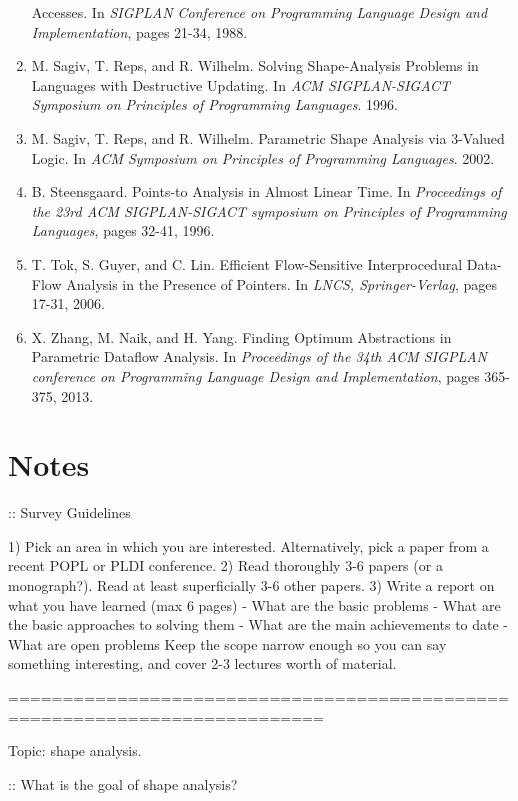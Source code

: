 \documentclass{article}
\begin{document}
\begin{enumerate}[1.]
        Accesses. In \textit{SIGPLAN Conference on Programming Language
        Design and Implementation}, pages 21-34, 1988.
    \item M. Sagiv, T. Reps, and R. Wilhelm. Solving Shape-Analysis Problems
        in Languages with Destructive Updating. In \textit{ACM
        SIGPLAN-SIGACT Symposium on Principles of Programming Languages}.
        1996.
    \item M. Sagiv, T. Reps, and R. Wilhelm. Parametric Shape Analysis via
        3-Valued Logic. In \textit{ACM Symposium on Principles of
        Programming Languages}. 2002.
    \item B. Steensgaard. Points-to Analysis in Almost Linear Time. In
        \textit{Proceedings of the 23rd ACM SIGPLAN-SIGACT symposium on
        Principles of Programming Languages}, pages 32-41, 1996.
    \item T. Tok, S. Guyer, and C. Lin. Efficient Flow-Sensitive
        Interprocedural Data-Flow Analysis in the Presence of Pointers. In
        \textit{LNCS, Springer-Verlag}, pages 17-31, 2006.
    \item X. Zhang, M. Naik, and H. Yang. Finding Optimum Abstractions in
        Parametric Dataflow Analysis. In \textit{Proceedings of the 34th ACM
        SIGPLAN conference on Programming Language Design and
        Implementation}, pages 365-375, 2013.
\end{enumerate}

\section*{Notes}

:: Survey Guidelines

1) Pick an area in which you are interested. Alternatively, pick a paper
   from a recent POPL or PLDI conference. 
2) Read thoroughly 3-6 papers (or a monograph?). Read at least superficially
   3-6 other papers. 
3) Write a report on what you have learned (max 6 pages)
        - What are the basic problems
        - What are the basic approaches to solving them
        - What are the main achievements to date
        - What are open problems
Keep the scope narrow enough so you can say something interesting, and cover
2-3 lectures worth of material.

===========================================================================

Topic: shape analysis.

:: What is the goal of shape analysis?
\end{document}
